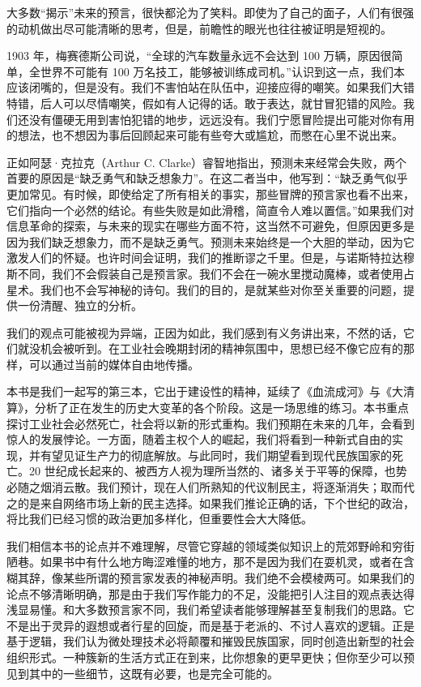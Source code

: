大多数“揭示”未来的预言，很快都沦为了笑料。即使为了自己的面子，人们有很强的动机做出尽可能清晰的思考，但是，前瞻性的眼光也往往被证明是短视的。


1903 年，梅赛德斯公司说，“全球的汽车数量永远不会达到 100 万辆，原因很简单，全世界不可能有 100 万名技工，能够被训练成司机。”认识到这一点，我们本应该闭嘴的，但是没有。我们不害怕站在队伍中，迎接应得的嘲笑。如果我们大错特错，后人可以尽情嘲笑，假如有人记得的话。敢于表达，就甘冒犯错的风险。我们还没有僵硬无用到害怕犯错的地步，远远没有。我们宁愿冒险提出可能对你有用的想法，也不想因为事后回顾起来可能有些夸大或尴尬，而憋在心里不说出来。


正如阿瑟·克拉克（Arthur C. Clarke）睿智地指出，预测未来经常会失败，两个首要的原因是“缺乏勇气和缺乏想象力”。在这二者当中，他写到：“缺乏勇气似乎更加常见。有时候，即使给定了所有相关的事实，那些冒牌的预言家也看不出来，它们指向一个必然的结论。有些失败是如此滑稽，简直令人难以置信。”如果我们对信息革命的探索，与未来的现实在哪些方面不符，这当然不可避免，但原因更多是因为我们缺乏想象力，而不是缺乏勇气。预测未来始终是一个大胆的举动，因为它激发人们的怀疑。也许时间会证明，我们的推断谬之千里。但是，与诺斯特拉达穆斯不同，我们不会假装自己是预言家。我们不会在一碗水里搅动魔棒，或者使用占星术。我们也不会写神秘的诗句。我们的目的，是就某些对你至关重要的问题，提供一份清醒、独立的分析。


我们的观点可能被视为异端，正因为如此，我们感到有义务讲出来，不然的话，它们就没机会被听到。在工业社会晚期封闭的精神氛围中，思想已经不像它应有的那样，可以通过当前的媒体自由地传播。


本书是我们一起写的第三本，它出于建设性的精神，延续了《血流成河》与《大清算》，分析了正在发生的历史大变革的各个阶段。这是一场思维的练习。本书重点探讨工业社会必然死亡，社会将以新的形式重构。我们预期在未来的几年，会看到惊人的发展悖论。一方面，随着主权个人的崛起，我们将看到一种新式自由的实现，并有望见证生产力的彻底解放。与此同时，我们期望看到现代民族国家的死亡。20 世纪成长起来的、被西方人视为理所当然的、诸多关于平等的保障，也势必随之烟消云散。我们预计，现在人们所熟知的代议制民主，将逐渐消失；取而代之的是来自网络市场上新的民主选择。如果我们推论正确的话，下个世纪的政治，将比我们已经习惯的政治更加多样化，但重要性会大大降低。


我们相信本书的论点并不难理解，尽管它穿越的领域类似知识上的荒郊野岭和穷街陋巷。如果书中有什么地方晦涩难懂的地方，那不是因为我们在耍机灵，或者在含糊其辞，像某些所谓的预言家发表的神秘声明。我们绝不会模棱两可。如果我们的论点不够清晰明确，那是由于我们写作能力的不足，没能把引人注目的观点表达得浅显易懂。和大多数预言家不同，我们希望读者能够理解甚至复制我们的思路。它不是出于灵异的遐想或者行星的回旋，而是基于老派的、不讨人喜欢的逻辑。正是基于逻辑，我们认为微处理技术必将颠覆和摧毁民族国家，同时创造出新型的社会组织形式。一种簇新的生活方式正在到来，比你想象的更早更快；但你至少可以预见到其中的一些细节，这既有必要，也是完全可能的。


